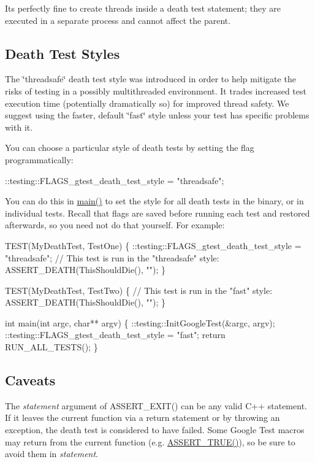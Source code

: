 It\textquotesingle{}s perfectly fine to create threads inside a death test statement; they are executed in a separate process and cannot affect the parent.

\subsection*{Death Test Styles}

The \char`\"{}threadsafe\char`\"{} death test style was introduced in order to help mitigate the risks of testing in a possibly multithreaded environment. It trades increased test execution time (potentially dramatically so) for improved thread safety. We suggest using the faster, default \char`\"{}fast\char`\"{} style unless your test has specific problems with it.

You can choose a particular style of death tests by setting the flag programmatically\+:


\begin{DoxyCode}
::testing::FLAGS\_gtest\_death\_test\_style = "threadsafe";
\end{DoxyCode}


You can do this in {\ttfamily \hyperlink{app_2main_8cpp_ae66f6b31b5ad750f1fe042a706a4e3d4}{main()}} to set the style for all death tests in the binary, or in individual tests. Recall that flags are saved before running each test and restored afterwards, so you need not do that yourself. For example\+:


\begin{DoxyCode}
TEST(MyDeathTest, TestOne) \{
  ::testing::FLAGS\_gtest\_death\_test\_style = "threadsafe";
  // This test is run in the "threadsafe" style:
  ASSERT\_DEATH(ThisShouldDie(), "");
\}

TEST(MyDeathTest, TestTwo) \{
  // This test is run in the "fast" style:
  ASSERT\_DEATH(ThisShouldDie(), "");
\}

int main(int argc, char** argv) \{
  ::testing::InitGoogleTest(&argc, argv);
  ::testing::FLAGS\_gtest\_death\_test\_style = "fast";
  return RUN\_ALL\_TESTS();
\}
\end{DoxyCode}


\subsection*{Caveats}

The {\itshape statement} argument of {\ttfamily A\+S\+S\+E\+R\+T\+\_\+\+E\+X\+I\+T()} can be any valid C++ statement. If it leaves the current function via a {\ttfamily return} statement or by throwing an exception, the death test is considered to have failed. Some Google Test macros may return from the current function (e.\+g. {\ttfamily \hyperlink{gtest_8h_ae9244bfbda562e8b798789b001993fa5}{A\+S\+S\+E\+R\+T\+\_\+\+T\+R\+U\+E()}}), so be sure to avoid them in {\itshape statement}.

